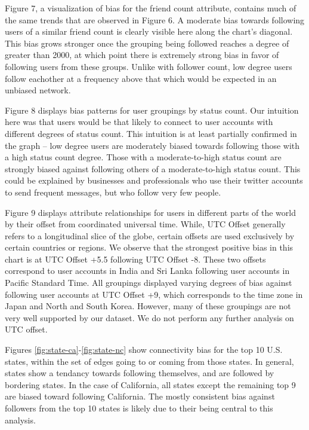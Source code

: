 Figure 7, a visualization of bias for the friend count attribute, contains much of the same trends that are observed in Figure 6.  A moderate bias towards following users of a similar friend count is clearly visible here along the chart's diagonal.  This bias grows stronger once the grouping being followed reaches a degree of greater than 2000, at which point there is extremely strong bias in favor of following users from these groups.  Unlike with follower count, low degree users follow eachother at a frequency above that which would be expected in an unbiased network.

Figure 8 displays bias patterns for user groupings by status count.  Our intuition here was that users would be that likely to connect to user accounts with different degrees of status count.  This intuition is at least partially confirmed in the graph -- low degree users are moderately biased towards following those with a high status count degree.  Those with a moderate-to-high status count are strongly biased against following others of a moderate-to-high status count.  This could be explained by businesses and professionals who use their twitter accounts to send frequent messages, but who follow very few people.

Figure 9 displays attribute relationships for users in different parts of the world by their offset from coordinated universal time.  While, UTC Offset generally refers to a longitudinal slice of the globe, certain offsets are used exclusively by certain countries or regions.  We observe that the strongest positive bias in this chart is at UTC Offset +5.5 following UTC Offset -8.  These two offsets correspond to user accounts in India and Sri Lanka following user accounts in Pacific Standard Time.  All groupings displayed varying degrees of bias against following user accounts at UTC Offset +9, which corresponds to the time zone in Japan and North and South Korea.  However, many of these groupings are not very well supported by our dataset.  We do not perform any further analysis on UTC offset.

Figures \ref{fig:state-ca}-\ref{fig:state-nc} show connectivity bias for the top 10 U.S. states, within the set of edges going to or coming from those states.  In general, states show a tendancy towards following themselves, and are followed by bordering states.  In the case of California, all states except the remaining top 9 are biased toward following California.  The mostly consistent bias against followers from the top 10 states is likely due to their being central to this analysis.

